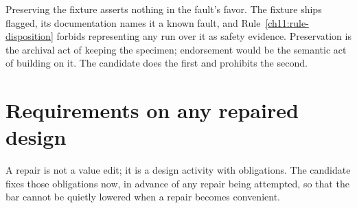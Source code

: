 \begin{remark}\label{ch11:rem-notendorse}
Preserving the fixture asserts nothing in the fault's favor. The fixture ships flagged, its documentation names it a known fault, and Rule~\ref{ch11:rule-disposition} forbids representing any run over it as safety evidence. Preservation is the archival act of keeping the specimen; endorsement would be the semantic act of building on it. The candidate does the first and prohibits the second.
\end{remark}

\section{Requirements on any repaired design}\label{ch11:repair}

A repair is not a value edit; it is a design activity with obligations. The candidate fixes those obligations now, in advance of any repair being attempted, so that the bar cannot be quietly lowered when a repair becomes convenient.

